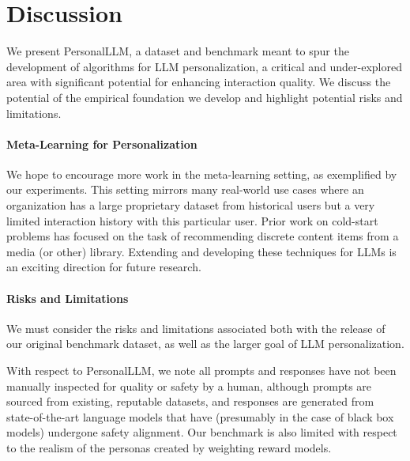 \vspace{-5pt}
\section{Discussion}\label{sec:discussion}
\vspace{-5pt}

We present \textsf{PersonalLLM}, a dataset and benchmark meant to spur the development of algorithms for LLM personalization, a critical and under-explored area with significant potential for enhancing interaction quality.   We discuss the potential of the empirical foundation we develop and highlight potential risks and limitations.


\paragraph{Meta-Learning for Personalization}
We hope to encourage more work in the meta-learning setting, as exemplified by our experiments. This setting mirrors many real-world use cases where an organization has a large proprietary dataset from historical users but a very limited interaction history with this particular user. 
Prior work on cold-start problems has focused on the task of recommending discrete content items from a media (or other) library. 
Extending and developing these techniques for LLMs is an exciting direction for future research. 

\paragraph{Risks and Limitations} 
We must consider the risks and limitations associated both with the release of our original benchmark dataset, as well as the larger goal of LLM personalization.

With respect to \textsf{PersonalLLM}, we note all prompts and responses have not been manually inspected for quality or safety by a human, although prompts are sourced from existing, reputable datasets, and responses are generated from state-of-the-art language models that have (presumably in the case of black box models) undergone safety alignment.
Our benchmark is also limited with respect to the realism of the personas created by weighting reward models.

